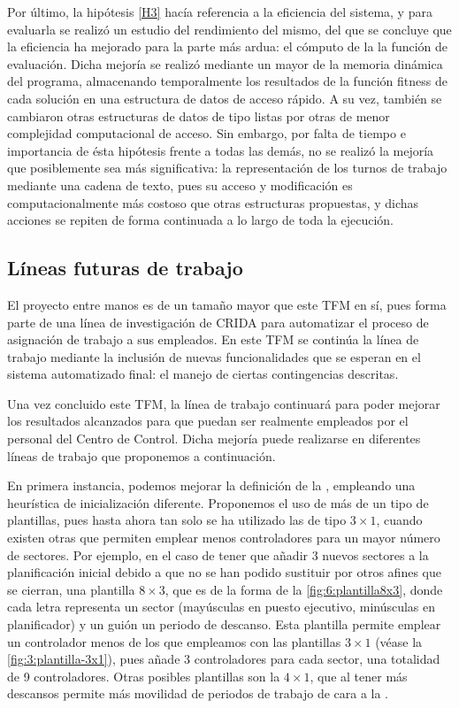 Por último, la hipótesis \ref{H3} hacía referencia a la eficiencia del sistema, y para evaluarla se realizó un estudio del rendimiento del mismo, del que se concluye que la eficiencia ha mejorado para la parte más ardua: el cómputo de la la función de evaluación. Dicha mejoría se realizó mediante un mayor de la memoria dinámica del programa, almacenando temporalmente los resultados de la función fitness de cada solución en una estructura de datos de acceso rápido. A su vez, también se cambiaron otras estructuras de datos de tipo listas por otras de menor complejidad computacional de acceso. Sin embargo, por falta de tiempo e importancia de ésta hipótesis frente a todas las demás, no se realizó la mejoría que posiblemente sea más significativa: la representación de los turnos de trabajo mediante una cadena de texto, pues su acceso y modificación es computacionalmente más costoso que otras estructuras propuestas, y dichas acciones se repiten de forma continuada a lo largo de toda la ejecución.

\subsection{Líneas futuras de trabajo}
\label{sec:6:trabajo-futuro}

El proyecto entre manos es de un tamaño mayor que este TFM en sí, pues forma parte de una línea de investigación de \gls{CRIDA} para automatizar el proceso de asignación de trabajo a sus empleados. En este TFM se continúa la línea de trabajo mediante la inclusión de nuevas funcionalidades que se esperan en el sistema automatizado final: el manejo de ciertas contingencias descritas.

Una vez concluido este TFM, la línea de trabajo continuará para poder mejorar los resultados alcanzados para que puedan ser realmente empleados por el personal del Centro de Control. Dicha mejoría puede realizarse en diferentes líneas de trabajo que proponemos a continuación.

En primera instancia, podemos mejorar la definición de la \faseuno{}, empleando una heurística de inicialización diferente. Proponemos el uso de más de un tipo de plantillas, pues hasta ahora tan solo se ha utilizado las de tipo $3\times1$, cuando existen otras que permiten emplear menos controladores para un mayor número de sectores. Por ejemplo, en el caso de tener que añadir 3 nuevos sectores a la planificación inicial debido a que no se han podido sustituir por otros afines que se cierran, una plantilla $8\times3$, que es de la forma de la \autoref{fig:6:plantilla8x3}, donde cada letra representa un sector (mayúsculas en puesto ejecutivo, minúsculas en planificador) y un guión un periodo de descanso. Esta plantilla permite emplear un controlador menos de los que empleamos con las plantillas $3\times1$ (véase la \autoref{fig:3:plantilla-3x1}), pues añade 3 controladores para cada sector, una totalidad de 9 controladores. Otras posibles plantillas son la $4\times1$, que al tener más descansos permite más movilidad de periodos de trabajo de cara a la \fasedos{}. %

